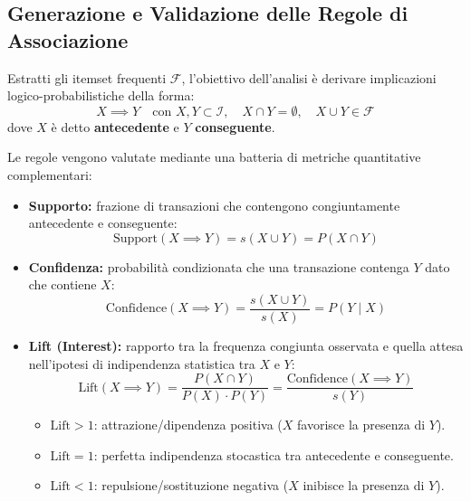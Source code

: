 \FloatBarrier
\subsection{Generazione e Validazione delle Regole di Associazione}
\label{subsec:lab-association-rules}

Estratti gli itemset frequenti $\mathcal{F}$, l'obiettivo dell'analisi è derivare implicazioni logico-probabilistiche della forma:
\begin{equation}
    X \implies Y \quad \text{con } X, Y \subset \mathcal{I}, \quad X \cap Y = \emptyset, \quad X \cup Y \in \mathcal{F}
\end{equation}
dove $X$ è detto \textbf{antecedente} e $Y$ \textbf{conseguente}.

\begin{definition}
Le regole vengono valutate mediante una batteria di metriche quantitative complementari:
\begin{itemize}
    \item \textbf{Supporto:} frazione di transazioni che contengono congiuntamente antecedente e conseguente:
    \begin{equation}
        \text{Support}(X \implies Y) = s(X \cup Y) = P(X \cap Y)
    \end{equation}
    \item \textbf{Confidenza:} probabilità condizionata che una transazione contenga $Y$ dato che contiene $X$:
    \begin{equation}
        \text{Confidence}(X \implies Y) = \frac{s(X \cup Y)}{s(X)} = P(Y \mid X)
    \end{equation}
    \item \textbf{Lift (Interest):} rapporto tra la frequenza congiunta osservata e quella attesa nell'ipotesi di indipendenza statistica tra $X$ e $Y$:
    \begin{equation}
        \text{Lift}(X \implies Y) = \frac{P(X \cap Y)}{P(X) \cdot P(Y)} = \frac{\text{Confidence}(X \implies Y)}{s(Y)}
    \end{equation}
    \begin{itemize}
        \item $\text{Lift} > 1$: attrazione/dipendenza positiva ($X$ favorisce la presenza di $Y$).
        \item $\text{Lift} = 1$: perfetta indipendenza stocastica tra antecedente e conseguente.
        \item $\text{Lift} < 1$: repulsione/sostituzione negativa ($X$ inibisce la presenza di $Y$).

\end{itemize}
\end{itemize}
\end{definition}
